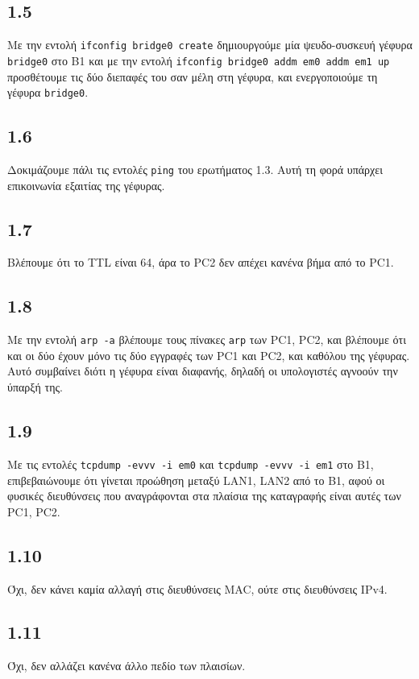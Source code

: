 \documentclass[a4paper, 12pt]{article}
\begin{document}
	\subsection*{1.5}
		Με την εντολή \verb|ifconfig bridge0 create| δημιουργούμε μία ψευδο-συσκευή γέφυρα \verb|bridge0| στο Β1 και με την εντολή \verb|ifconfig bridge0 addm em0 addm em1 up| προσθέτουμε τις δύο διεπαφές του σαν μέλη στη γέφυρα, και ενεργοποιούμε τη γέφυρα \verb|bridge0|. 
	
	\subsection*{1.6}
		Δοκιμάζουμε πάλι τις εντολές \verb|ping| του ερωτήματος 1.3. Αυτή τη φορά υπάρχει επικοινωνία εξαιτίας της γέφυρας.
	
	\subsection*{1.7}
		Βλέπουμε ότι το TTL είναι 64, άρα το PC2 δεν απέχει κανένα βήμα από το PC1.
	
	\subsection*{1.8}
		Με την εντολή \verb|arp -a| βλέπουμε τους πίνακες \verb|arp| των PC1, PC2, και βλέπουμε ότι και οι δύο έχουν μόνο τις δύο εγγραφές των PC1 και PC2, και καθόλου της γέφυρας. Αυτό συμβαίνει διότι η γέφυρα είναι διαφανής, δηλαδή οι υπολογιστές αγνοούν την ύπαρξή της.
	
	\subsection*{1.9}
		Με τις εντολές \verb|tcpdump -evvv -i em0| και \verb|tcpdump -evvv -i em1| στο B1, επιβεβαιώνουμε ότι γίνεται προώθηση μεταξύ LAN1, LAN2 από το B1, αφού οι φυσικές διευθύνσεις που αναγράφονται στα πλαίσια της καταγραφής είναι αυτές των PC1, PC2.
	
	\subsection*{1.10}
		Όχι, δεν κάνει καμία αλλαγή στις διευθύνσεις MAC, ούτε στις διευθύνσεις IPv4.
	
	\subsection*{1.11}
	 	Όχι, δεν αλλάζει κανένα άλλο πεδίο των πλαισίων.
	
\end{document}

